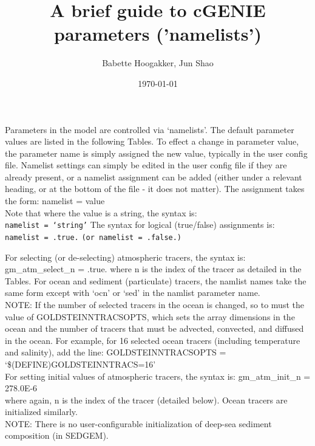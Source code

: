 \documentclass[english,10pt,twoside]{article}
\title{A brief guide to cGENIE parameters ('namelists')}
\author{Babette Hoogakker, Jun Shao}
\date{\today}
\begin{document}

\maketitle



Parameters in the model are controlled via `namelists'. The default parameter values are listed in the following Tables. To effect a change in parameter value, the parameter name is simply assigned the new value, typically in the user config file.
Namelist settings can simply be edited in the user config file if they are already present, or a namelist assignment can be added (either under a relevant heading, or at the bottom of the file - it does not matter). The assignment takes the form:
namelist = value\\
Note that where the value is a string, the syntax is:\\
\texttt{namelist = `string'}
The syntax for logical (true/false) assignments is:\\
\texttt{namelist = .true.}
\texttt{(or namelist = .false.)}

For selecting (or de-selecting) atmospheric tracers, the syntax is: gm\_atm\_select\_n = .true.
where n is the index of the tracer as detailed in the Tables. For ocean and sediment (particulate) tracers, the namlist names take the same form except with `ocn' or `sed' in the namlist parameter name.\\

NOTE: If the number of selected tracers in the ocean is changed, so to must the value of GOLDSTEINNTRACSOPTS, which sets the array dimensions in the ocean and the number of tracers that must be advected, convected, and diffused in the
ocean. For example, for 16 selected ocean tracers (including temperature and salinity), add the line:
GOLDSTEINNTRACSOPTS = `\$(DEFINE)GOLDSTEINNTRACS=16'\\

For setting initial values of atmospheric tracers, the syntax is:
gm\_atm\_init\_n = 278.0E-6\\
where again, n is the index of the tracer (detailed below). Ocean tracers are initialized similarly.\\
NOTE: There is no user-configurable initialization of deep-sea sediment composition (in SEDGEM).\\
\end{document}
